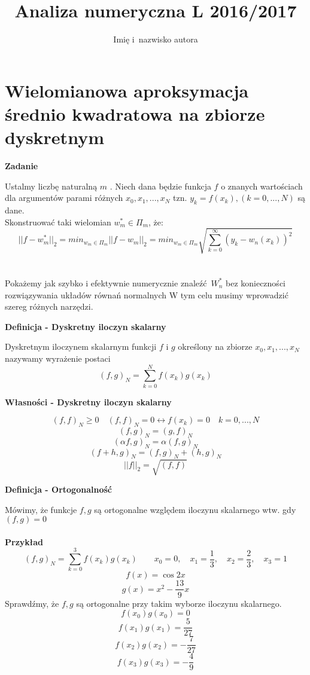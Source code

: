 \documentclass[polish]{kbk}
\begin{document}
\author{Imię i~nazwisko autora}
\title{Analiza numeryczna L 2016/2017}



\maketitle

\section{Wielomianowa aproksymacja średnio kwadratowa na zbiorze dyskretnym}

\begin{center}
\textbf{Zadanie}
\end{center}
Ustalmy liczbę naturalną  \(m\) . Niech dana będzie funkcja \(f\) o znanych wartościach dla argumentów parami różnych \(x_0, x_1, ... , x_N\) tzn. 
 \(y_k = f(x_k), (k =0,...,N) \) są dane.\\
Skonstruować taki wielomian \(   w^{*}_m \in \Pi_{m}  \), że:
$$ || f -  w^{*}_m ||_2 = min_{ w_m \in \Pi_m } || f - w_m||_2 = min_{ w_m \in \Pi_m } \sqrt{  \sum_{k=0}^{\infty} (y_k - w_n (x_k))^2 }$$
\\
\\
Pokażemy jak szybko i efektywnie numerycznie znaleźć \(W^{*}_n \) bez konieczności rozwiązywania układów równań normalnych
W tym celu musimy wprowadzić szereg różnych narzędzi.
\\
\begin{center}
\textbf{Definicja - Dyskretny iloczyn skalarny}
\end{center}

Dyskretnym iloczynem skalarnym funkcji \(f\) i \(g\) określony na zbiorze  \(x_0, x_1, ... , x_N\) nazywamy wyrażenie postaci
$$ (f,g)_N =  \sum_{k=0}^{N} f(x_k)  g(x_k) $$


\begin{center}
\textbf{Własności - Dyskretny iloczyn skalarny}
\end{center}
$$ (f,f)_N \geq 0 \quad (f,f)_N = 0  \leftrightarrow  f(x_k) = 0  \quad k = 0,...,N$$
$$ (f,g)_N = (g,f)_N $$
$$ (\alpha f,g)_N = \alpha (f,g)_N $$
$$ (f+h, g)_N = (f,g)_N + (h,g)_N $$
$$ ||f||_2 = \sqrt { (f,f) } $$ 

\begin{center}
\textbf{Definicja - Ortogonalność}
\end{center}
Mówimy, że funkcje \(f,g\) są ortogonalne względem iloczynu skalarnego wtw. gdy \( (f,g) = 0 \) \\ \\
\textbf{Przykład} \\
$$ (f,g)_N = \sum_{k=0}^{3} f(x_k)g(x_k) \quad  \quad x_0 = 0,  \quad x_1 = \frac{1}{3},  \quad x_2 = \frac{2}{3},  \quad x_3 = 1 $$
$$ f(x) = \cos{2x} $$
$$ g(x) = x^2 - \frac{13}{9}x $$
Sprawdźmy, że \(f,g\) są ortogonalne przy takim wyborze iloczynu skalarnego.
$$ f(x_0)g(x_0) = 0 $$
$$ f(x_1)g(x_1) = \frac{5}{27} $$
$$ f(x_2)g(x_2) = - \frac{7}{27} $$
$$ f(x_3)g(x_3) = - \frac{4}{9} $$
\end{document}
